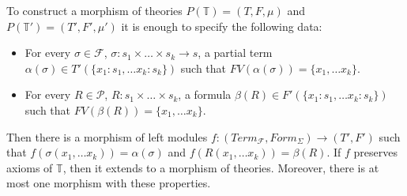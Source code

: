 \documentclass[reqno]{amsart}
\theoremstyle{definition}
\theoremstyle{remark}
\numberwithin{figure}{section}
\begin{document}
\begin{prop}
To construct a morphism of theories $P(\mathbb{T}) = (T,F,\mu)$ and $P(\mathbb{T}') = (T',F',\mu')$ it is enough to specify the following data:
\begin{itemize}
\item For every $\sigma \in \mathcal{F}$, $\sigma : s_1 \times \ldots \times s_k \to s$,
    a partial term $\alpha(\sigma) \in T'(\{ x_1 : s_1, \ldots x_k : s_k \})$ such that $FV(\alpha(\sigma)) = \{ x_1, \ldots x_k \}$.
\item For every $R \in \mathcal{P}$, $R : s_1 \times \ldots \times s_k$,
    a formula $\beta(R) \in F'(\{ x_1 : s_1, \ldots x_k : s_k \})$ such that $FV(\beta(R)) = \{ x_1, \ldots x_k \}$.
\end{itemize}
Then there is a morphism of left modules $f : (Term_\mathcal{F},Form_\Sigma) \to (T',F')$
    such that $f(\sigma(x_1, \ldots x_k)) = \alpha(\sigma)$ and $f(R(x_1, \ldots x_k)) = \beta(R)$.
If $f$ preserves axioms of $\mathbb{T}$, then it extends to a morphism of theories.
Moreover, there is at most one morphism with these properties.
\end{prop}
\end{document}
